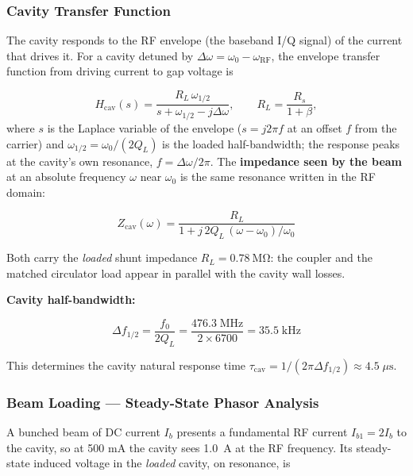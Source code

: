 \subsubsection{Cavity Transfer Function}\label{sec:cavity-tf}


The cavity responds to the RF envelope (the baseband I/Q signal) of the current that drives it. For a cavity detuned by \(\Delta\omega = \omega_0 - \omega_\text{RF}\), the envelope transfer function from driving current to gap voltage is

\begin{equation}\label{eq:cav-tf}
H_\text{cav}(s) = \frac{R_L \,\omega_{1/2}}{s + \omega_{1/2} - j\Delta\omega},
\qquad R_L = \frac{R_s}{1+\beta},
\end{equation}
where \(s\) is the Laplace variable of the envelope (\(s = j2\pi f\) at an offset \(f\) from the carrier) and \(\omega_{1/2} = \omega_0/(2Q_L)\) is the loaded half-bandwidth; the response peaks at the cavity's own resonance, \(f = \Delta\omega/2\pi\). The \textbf{impedance seen by the beam} at an absolute frequency \(\omega\) near \(\omega_0\) is the same resonance written in the RF domain:

\begin{equation}\label{eq:cav-imp}
Z_\text{cav}(\omega) = \frac{R_L}{1 + j\,2Q_L\,(\omega - \omega_0)/\omega_0}
\end{equation}

Both carry the \emph{loaded} shunt impedance \(R_L = \qty{0.78}{\mega\ohm}\): the coupler and the matched circulator load appear in parallel with the cavity wall losses.

\textbf{Cavity half-bandwidth:}

\begin{equation}\label{eq:cav-bw}
\Delta f_{1/2} = \frac{f_0}{2Q_L} = \frac{476.3\;\text{MHz}}{2 \times 6700} = 35.5\;\text{kHz}
\end{equation}

This determines the cavity natural response time \(\tau_\text{cav} = 1/(2\pi\Delta f_{1/2}) \approx 4.5\;\mu\text{s}\).

\subsubsection{Beam Loading --- Steady-State Phasor Analysis}\label{sec:beam-loading}


A bunched beam of DC current \(I_b\) presents a fundamental RF current \(I_{b1} = 2I_b\) to the cavity, so at 500 mA the cavity sees \qty{1.0}{\ampere} at the RF frequency. Its steady-state induced voltage in the \emph{loaded} cavity, on resonance, is

